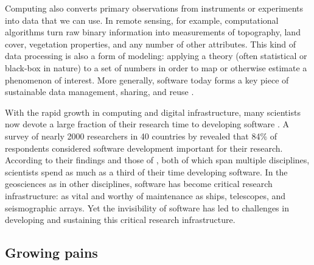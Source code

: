 \documentclass[12pt]{amsart}
\begin{document}
Computing also converts primary observations from instruments or experiments into data that we can use. In remote sensing, for example, computational algorithms turn raw binary information into measurements of topography, land cover, vegetation properties, and any number of other attributes. This kind of data processing is also a form of modeling: applying a theory (often statistical or black-box in nature) to a set of numbers in order to map or otherwise estimate a phenomenon of interest. More generally, software today forms a key piece of sustainable data management, sharing, and reuse \citep[e.g.,][]{hsu2015data}.

With the rapid growth in computing and digital infrastructure, many scientists now devote a large fraction of their research time to developing software \citep{hannay2009scientists,prabhu2011survey,wilson2014best,singh2016unsung,pinto2018scientists}. A survey of nearly 2000 researchers in 40 countries by \citet{hannay2009scientists} revealed that 84\% of respondents considered software development important for their research. According to their findings and those of \citet{prabhu2011survey}, both of which span multiple disciplines, scientists spend as much as a third of their time developing software. In the geosciences as in other disciplines, software has become critical research infrastructure: as vital and worthy of maintenance as ships, telescopes, and seismographic arrays. Yet the invisibility of software \citep[e.g.,][]{eghbal2016roads} has led to challenges in developing and sustaining this critical research infrastructure.


\subsection{Growing pains}
\end{document}
